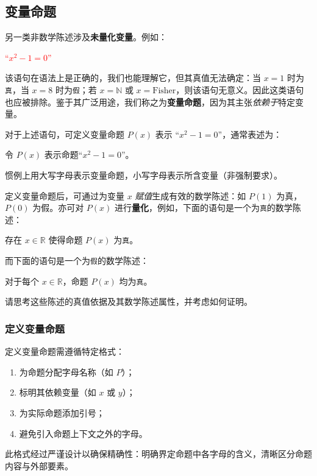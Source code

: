 \subsection{变量命题}

另一类非数学陈述涉及\textbf{未量化变量}。例如：
\begin{center}
    \textcolor{red}{``$x^2 - 1 = 0$''}
\end{center}

该语句在语法上是正确的，我们也能理解它，但其真值无法确定：当 $x = 1$ 时为\verb|真|，当 $x = 8$ 时为\verb|假|；若 $x = \mathbb{N}$ 或 $x = \text{Fisher}$，则该语句无意义。因此这类语句也应被排除。鉴于其广泛用途，我们称之为\textbf{变量命题}，因为其主张\emph{依赖于}特定变量。

对于上述语句，可定义变量命题 $P(x)$ 表示 ``$x^2 - 1 = 0$''，通常表述为：
\begin{center}
    \textcolor{olivegreen}{令 $P(x)$ 表示命题``$x^2 - 1 = 0$''。}
\end{center}
惯例上用大写字母表示变量命题，小写字母表示所含变量（非强制要求）。

定义变量命题后，可通过为变量 $x$ \emph{赋值}生成有效的数学陈述：如 $P(1)$ 为真，$P(0)$ 为假。亦可对 $P(x)$ 进行\textbf{量化}，例如，下面的语句是一个为\verb|真|的数学陈述：
\begin{center}
    存在 $x \in \mathbb{R}$ 使得命题 $P(x)$ 为\verb|真|。
\end{center}
而下面的语句是一个为\verb|假|的数学陈述：
\begin{center}
    对于每个 $x \in \mathbb{R}$，命题 $P(x)$ 均为\verb|真|。
\end{center}
请思考这些陈述的真值依据及其数学陈述属性，并考虑如何证明。

\subsubsection*{定义变量命题}

定义变量命题需遵循特定格式：
\begin{enumerate}[label=(\arabic*)]
    \item 为命题分配字母名称（如 $P$）；
    \item 标明其依赖变量（如 $x$ 或 $y$）；
    \item 为实际命题添加引号；
    \item 避免引入命题上下文之外的字母。
\end{enumerate}
此格式经过严谨设计以确保精确性：明确界定命题中各字母的含义，清晰区分命题内容与外部要素。

